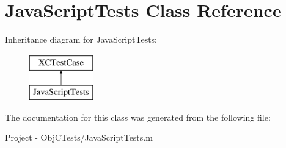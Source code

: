 \hypertarget{interface_java_script_tests}{}\section{Java\+Script\+Tests Class Reference}
\label{interface_java_script_tests}
Inheritance diagram for Java\+Script\+Tests\+:\begin{figure}[H]
\begin{center}
\leavevmode
\includegraphics[height=2.000000cm]{interface_java_script_tests}
\end{center}
\end{figure}


The documentation for this class was generated from the following file\+:\begin{DoxyCompactItemize}
\item 
Project -\/ Obj\+C\+Tests/Java\+Script\+Tests.\+m\end{DoxyCompactItemize}
